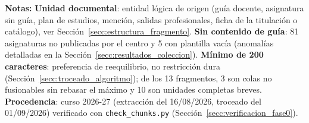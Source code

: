 \begin{table}[htbp]
\begin{tabular}{@{}l r@{}}
    \bottomrule
  \end{tabular}
    \begin{minipage}{0.95\textwidth}
    \vspace{4pt}
    \tiny
    \textbf{Notas:}
      \textbf{Unidad documental}: entidad lógica de origen (guía docente, asignatura sin guía, plan de estudios, mención, salidas profesionales, ficha de la titulación o catálogo), ver Sección~\ref{secc:estructura_fragmento}.
      \textbf{Sin contenido de guía}: 81 asignaturas no publicadas por el centro y 5 con plantilla vacía (anomalías detalladas en la Sección~\ref{secc:resultados_coleccion}).
      \textbf{Mínimo de 200 caracteres}: preferencia de reequilibrio, no restricción dura (Sección~\ref{secc:troceado_algoritmo}); de los 13 fragmentos, 3 son colas no fusionables sin rebasar el máximo y 10 son unidades completas breves.
      \textbf{Procedencia}: curso 2026-27 (extracción del 16/08/2026, troceado del 01/09/2026) verificado con \texttt{check\_chunks.py} (Sección~\ref{secc:verificacion_fase0}).
  \end{minipage}
\end{table}
